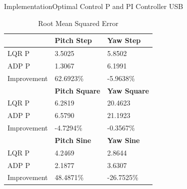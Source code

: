 \documentclass{beamer}
\begin{document}
\begin{frame}{Implementation}{Optimal Control P and PI Controller USB}
\begin{table}
    \centering
    \begin{tabular}{l|l|l}
        \toprule
        \textbf{} & \textbf{Pitch Step} & \textbf{Yaw Step}\\
        \toprule
        LQR P & 3.5025 & 5.8502\\
        ADP P & 1.3067 & 6.1991\\
        Improvement & 62.6923\% & -5.9638\% \\
        \toprule
        \textbf{} & \textbf{Pitch Square} & \textbf{Yaw Square}\\
        \toprule
        LQR P & 6.2819 & 20.4623\\
        ADP P & 6.5790 & 21.1923\\
        Improvement & -4.7294\% & -0.3567\% \\
        \toprule
        \textbf{} & \textbf{Pitch Sine} & \textbf{Yaw Sine}\\
        \toprule
        LQR P & 4.2469 & 2.8644\\
        ADP P & 2.1877 & 3.6307\\
        Improvement & 48.4871\% & -26.7525\% \\
    \end{tabular}
    \caption{Root Mean Squared Error}
    \label{tab:RMSE}
\end{table}
\end{frame}
\end{document}
